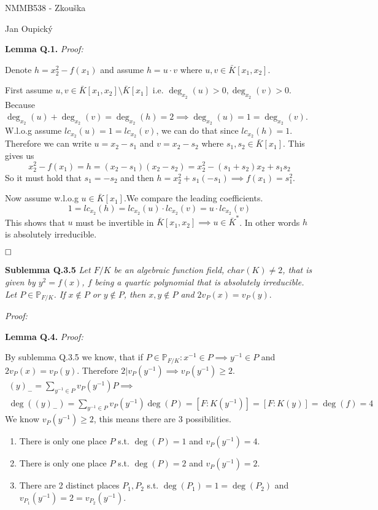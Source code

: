 \documentclass[12pt, a4paper]{article}
\newcommand{\qed}{\hfill\square}
\begin{document}
\begin{center}
\large NMMB538 - Zkouška

\normalsize Jan Oupický
\end{center}
\vspace{1\baselineskip}

\textbf{Lemma Q.1.} \textit{Proof:}

Denote $h = x_2^2 - f(x_1)$ and assume $h = u \cdot v$ where $u, v \in \bar{K}[x_1,x_2]$. 

First assume $u,v \in \bar{K}[x_1,x_2] \setminus \bar{K}[x_1]$ i.e. $\deg_{x_2}(u) > 0, \deg_{x_2}(v) > 0$. Because $\deg_{x_2}(u) + \deg_{x_2}(v) = \deg_{x_2}(h) = 2 \implies \deg_{x_2}(u) = 1 = \deg_{x_2}(v)$. W.l.o.g assume $lc_{x_2}(u)=1=lc_{x_2}(v)$, we can do that since $lc_{x_2}(h)=1$. Therefore we can write $u = x_2 - s_1$ and $v = x_2 - s_2$ where $s_1, s_2 \in \bar{K}[x_1]$. This gives us
\[
x_2^2 - f(x_1) =h = (x_2 - s_1)(x_2 - s_2) = x_2^2 - (s_1+s_2)x_2 + s_1 s_2
\]
So it must hold that $s_1 = -s_2$ and then $h = x_2^2 + s_1(-s_1) \implies f(x_1) = s_1^2$. 

Now assume w.l.o.g $u \in \bar{K}[x_1]$.We compare the leading coefficients.
\[
1 = lc_{x_2}(h) = lc_{x_2}(u) \cdot lc_{x_2}(v) = u \cdot lc_{x_2}(v)
\]
This shows that $u$ must be invertible in $\bar{K}[x_1,x_2] \implies u \in \bar{K}^*$. In other words $h$ is absolutely irreducible. 

$\qed$

\textbf{Sublemma Q.3.5} \textit{Let $F/K$ be an algebraic function field, $char(K) \neq 2$, that is given by $y^2 = f(x)$, $f$ being a quartic polynomial that is absolutely irreducible. Let $P \in \mathbb{P}_{F/K}$. If $x \notin P$ or $y \notin P$, then $x,y \notin P$ and $2v_P(x)=v_P(y)$}.

\textit{Proof:}

\textbf{Lemma Q.4.} \textit{Proof:}

By sublemma Q.3.5 we know, that if $P \in \mathbb{P}_{F/K}: x^{-1} \in P \implies y^{-1} \in P$ and $2v_P(x)=v_P(y)$. Therefore $2 | v_P(y^{-1}) \implies v_P(y^{-1}) \geq 2$. 
\begin{gather*}
(y)_{-} = \sum\limits_{y^{-1} \in P} v_P(y^{-1}) P \implies\\
\deg((y)_{-}) = \sum\limits_{y^{-1} \in P} v_P(y^{-1}) \deg(P) = [F:K(y^{-1})]=[F:K(y)]=\deg(f)=4
\end{gather*}
We know $v_P(y^{-1}) \geq 2$, this means there are 3 possibilities.
\begin{enumerate}
    \item There is only one place $P$ s.t. $\deg(P)=1$ and $v_P(y^{-1})=4$.
    \item There is only one place $P$ s.t. $\deg(P)=2$ and $v_P(y^{-1})=2$.
    \item There are 2 distinct places $P_1, P_2$ s.t. $\deg(P_1)=1=\deg(P_2)$ and $v_{P_1}(y^{-1})=2=v_{P_2}(y^{-1})$.
\end{enumerate}
\end{document}
